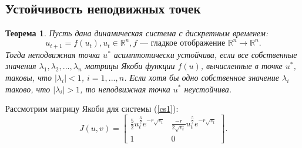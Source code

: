 \documentclass[12pt]{article}
\newtheorem{theorem}{Теорема}
\begin{document}
\subsection{Устойчивость неподвижных точек}
\begin{theorem}
    Пусть дана динамическая система с дискретным временем:
    $$
        u_{t+1} = f(u_t), u_t \in \mathbb{R}^n, f \text{ — гладкое отображение } \mathbb{R}^n \rightarrow \mathbb{R}^n.
    $$
    Тогда неподвижная точка $u^*$ асимптотически устойчива, если все собственные значения $\lambda_1, \lambda_2, ..., \lambda_n$ матрицы Якоби функции $f(u)$, вычисленные в точке $u^*$, таковы, что $|\lambda_i| < 1$, $i = 1, ..., n$. Если хотя бы одно собственное значение $\lambda_i$ таково, что $|\lambda_i| > 1$, то неподвижная точка $u^*$ неустойчива. \label{th2}
\end{theorem}
Рассмотрим матрицу Якоби для системы (\ref{cs1}):
$$
J(u,v) = 
\begin{bmatrix}
    \frac{5}{2}u_t^{\frac{3}{2}}e^{-r\sqrt{v_t}} & \frac{-r}{2\sqrt{v_t}}u_t^{\frac{5}{2}}e^{-r\sqrt{v_t}}\\
    1 & 0
\end{bmatrix}.
$$
\end{document}
